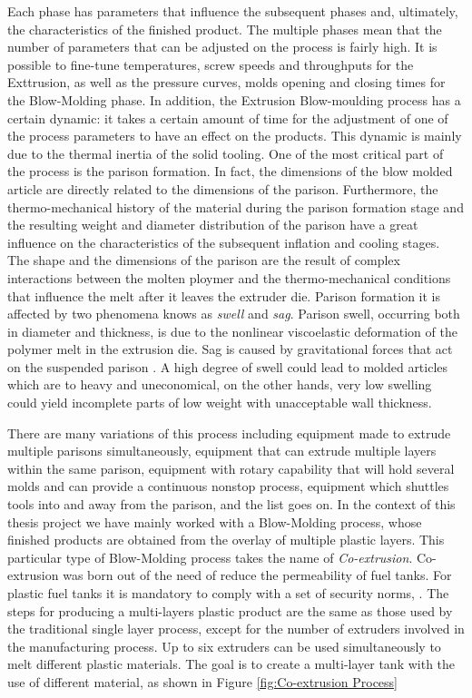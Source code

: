 Each phase has parameters that inﬂuence the subsequent phases and, ultimately, the characteristics of the ﬁnished product. The multiple phases mean that the number of parameters that can be adjusted on the process is fairly high. It is possible to fine-tune temperatures, screw speeds and throughputs for the Exttrusion, as well as the  pressure curves, molds opening and closing times for the Blow-Molding phase. In addition, the Extrusion Blow-moulding process has a certain dynamic: it takes a certain amount of time for the adjustment of one of the process parameters to have an effect on the products. This dynamic is mainly due to the thermal inertia of the solid tooling.
One of the most critical part of the process is the parison formation. In fact, the dimensions of the blow molded article are directly related to the dimensions of the parison. Furthermore, the thermo-mechanical history of the material during the parison formation stage and the resulting weight and diameter distribution of the parison have a great influence on the characteristics of the subsequent inflation and cooling stages. The shape and the dimensions of the parison are the result of complex interactions between the molten ploymer and the thermo-mechanical conditions that influence the melt after it leaves the extruder die. Parison formation it is affected by two phenomena knows as \textit{swell} and \textit{sag}. Parison swell, occurring both in diameter and thickness, is due to the nonlinear viscoelastic deformation of the polymer melt in the extrusion die. Sag is caused by gravitational forces that act on the suspended parison \citep{huang2002prediction}. A high degree of swell could lead to molded articles which are to heavy and uneconomical, on the other hands, very low swelling could yield incomplete parts of low weight with unacceptable wall thickness.

There are many variations of this process including equipment made to extrude multiple parisons simultaneously, equipment that can extrude multiple layers within the same parison, equipment with rotary capability that will hold several molds and can provide a continuous nonstop process, equipment which shuttles tools into and away from the parison, and the list goes on. In the context of this thesis project we have mainly worked with a Blow-Molding process, whose finished products are obtained from the overlay of multiple plastic layers. This particular type of Blow-Molding process takes the name of \textit{Co-extrusion}. Co-extrusion was born out of the need of reduce the permeability of fuel tanks. For plastic fuel tanks it is mandatory to comply with a set of security norms, .
The steps for producing a multi-layers plastic product are the same as those used by the traditional single layer process, except for the number of extruders involved in the manufacturing process. Up to six extruders can be used simultaneously to melt different plastic materials. The goal is to create a multi-layer tank with the use of different material, as shown in
Figure \ref{fig:Co-extrusion Process}


